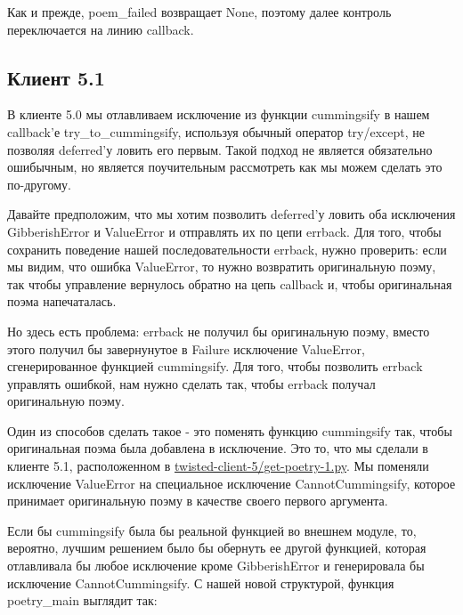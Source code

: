 Как и прежде, poem\_failed возвращает None, поэтому далее контроль переключается на 
линию callback.

\subsection{Клиент 5.1}


В клиенте 5.0 мы отлавливаем исключение из функции cummingsify в 
нашем callback'е try\_to\_cummingsify, используя обычный оператор 
try/except, не позволяя deferred'у ловить его первым. Такой подход 
не является обязательно ошибычным, но является поучительным рассмотреть 
как мы можем сделать это по-другому.  


Давайте предположим, что мы хотим позволить deferred'у ловить 
оба исключения GibberishError и ValueError и отправлять их 
по цепи errback. Для того, чтобы сохранить поведение нашей 
последовательности errback, нужно проверить: если мы видим, что 
ошибка ValueError, то нужно возвратить оригинальную поэму, так чтобы 
управление вернулось обратно на цепь callback и, чтобы оригинальная 
поэма напечаталась.


Но здесь есть проблема: errback не получил бы оригинальную поэму, 
вместо этого получил бы завернунутое в Failure исключение ValueError, 
сгенерированное функцией cummingsify. Для того, чтобы позволить 
errback управлять ошибкой, нам нужно сделать так, чтобы errback получал 
оригинальную поэму.


Один из способов сделать такое - это поменять функцию cummingsify так, чтобы 
оригинальная поэма была добавлена в исключение. Это то, что мы сделали в клиенте 5.1, 
расположенном в 
\href{http://github.com/jdavisp3/twisted-intro/blob/master/twisted-client-5/get-poetry-1.py#L1}{twisted-client-5/get-poetry-1.py}. Мы поменяли исключение ValueError на специальное исключение CannotCummingsify, которое 
принимает оригинальную поэму в качестве своего первого аргумента. 


Если бы cummingsify была бы реальной функцией во внешнем модуле, 
то, вероятно, лучшим решением было бы обернуть ее другой функцией, 
которая отлавливала бы любое исключение кроме GibberishError 
и генерировала бы исключение CannotCummingsify. С нашей новой 
структурой, функция poetry\_main выглядит так:

